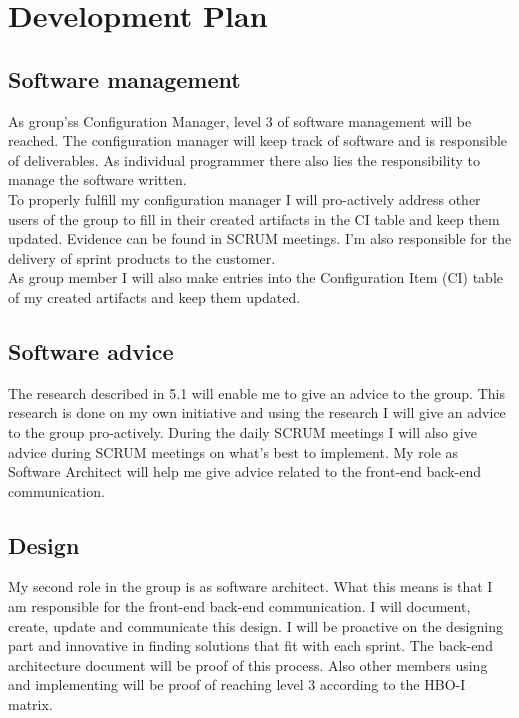 \newpage
\section{Development Plan}
\label{sec:development}

\subsection{Software management}
As group'ss Configuration Manager, level 3 of software management will be reached. The configuration manager will keep track of software and is responsible of deliverables. As individual programmer there also lies the responsibility to manage the software written.\\  
To properly fulfill my configuration manager I will pro-actively address other users of the group to fill in their created artifacts in the CI table and keep them updated. Evidence can be found in SCRUM meetings. I'm also responsible for the delivery of sprint products to the customer.  \\
As group member I will also make entries into the Configuration Item (CI) table of my created artifacts and keep them updated. \\


\subsection{Software advice}
The research described in 5.1 will enable me to give an advice to the group. This research is done on my own initiative and using the research I will give an advice to the group pro-actively. During the daily SCRUM meetings I will also give advice during SCRUM meetings on what's best to implement. My role as Software Architect will help me give advice related to the front-end back-end communication.

\subsection{Design}
My second role in the group is as software architect. What this means is that I am responsible for the front-end back-end communication. I will document, create, update and communicate this design.
I will be proactive on the designing part and innovative in finding solutions that fit with each sprint. The back-end architecture document will be proof of this process. Also other members using and implementing will be proof of reaching level 3 according to the HBO-I matrix.

